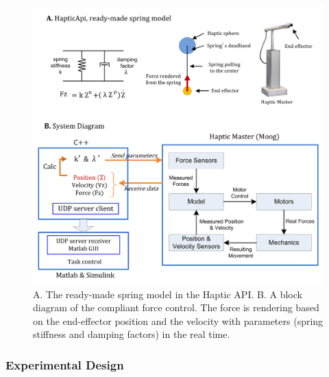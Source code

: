 %
\begin{figure}
  \centering
  \includegraphics[scale=0.5]{Chie/figs/Figure3.png}
  \caption{A. The ready-made spring model in the Haptic API. B. A block diagram of the compliant force control. The force is rendering based on the end-effector position and the velocity with parameters (spring stiffness and damping factors) in the real time.}
  \label{modelling}
\end{figure}

\subsubsection{Experimental Design}

